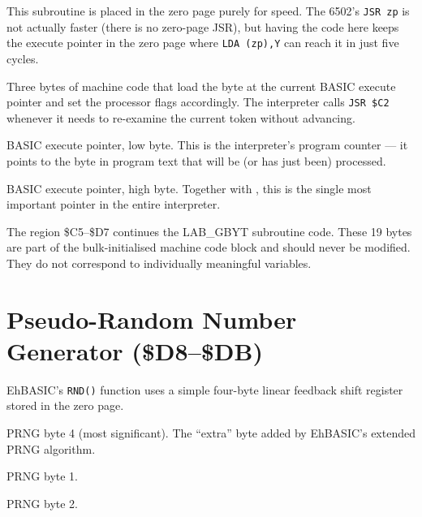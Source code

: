 This subroutine is placed in the zero page purely for speed.  The 6502's
\texttt{JSR zp} is not actually faster (there is no zero-page JSR), but
having the code here keeps the execute pointer in the zero page where
\texttt{LDA (zp),Y} can reach it in just five cycles.


Three bytes of machine code that load the byte at the current BASIC execute
pointer and set the processor flags accordingly.  The interpreter calls
\texttt{JSR \$C2} whenever it needs to re-examine the current token without
advancing.


BASIC execute pointer, low byte.  This is the interpreter's program counter
--- it points to the byte in program text that will be (or has just been)
processed.


BASIC execute pointer, high byte.  Together with , this is the
single most important pointer in the entire interpreter.

\begin{notebox}
The region \$C5--\$D7 continues the LAB\_GBYT subroutine code.  These 19
bytes are part of the bulk-initialised machine code block and should never be
modified.  They do not correspond to individually meaningful variables.
\end{notebox}

\section{Pseudo-Random Number Generator (\$D8--\$DB)}

EhBASIC's \texttt{RND()} function uses a simple four-byte linear feedback
shift register stored in the zero page.


PRNG byte 4 (most significant).  The ``extra'' byte added by EhBASIC's
extended PRNG algorithm.


PRNG byte 1.


PRNG byte 2.

